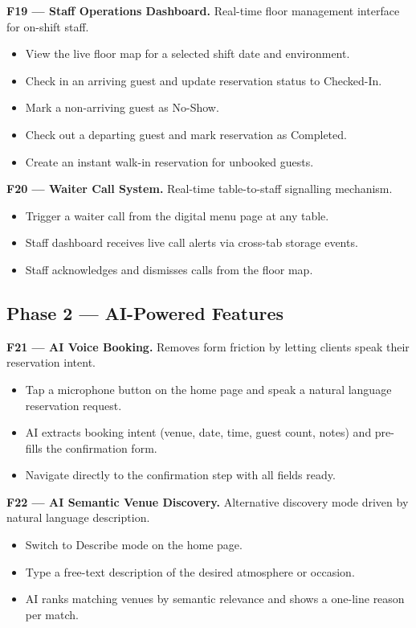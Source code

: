 \documentclass[12pt,a4paper]{article}
\begin{document}
\textbf{F19 --- Staff Operations Dashboard.}
Real-time floor management interface for on-shift staff.
\begin{itemize}[leftmargin=1.5em, topsep=2pt, itemsep=1pt]
    \item View the live floor map for a selected shift date and environment.
    \item Check in an arriving guest and update reservation status to
          Checked-In.
    \item Mark a non-arriving guest as No-Show.
    \item Check out a departing guest and mark reservation as Completed.
    \item Create an instant walk-in reservation for unbooked guests.
\end{itemize}

\textbf{F20 --- Waiter Call System.}
Real-time table-to-staff signalling mechanism.
\begin{itemize}[leftmargin=1.5em, topsep=2pt, itemsep=1pt]
    \item Trigger a waiter call from the digital menu page at any table.
    \item Staff dashboard receives live call alerts via cross-tab storage events.
    \item Staff acknowledges and dismisses calls from the floor map.
\end{itemize}

\subsection{Phase 2 --- AI-Powered Features}

\textbf{F21 --- AI Voice Booking.}
Removes form friction by letting clients speak their reservation intent.
\begin{itemize}[leftmargin=1.5em, topsep=2pt, itemsep=1pt]
    \item Tap a microphone button on the home page and speak a natural language
          reservation request.
    \item AI extracts booking intent (venue, date, time, guest count, notes)
          and pre-fills the confirmation form.
    \item Navigate directly to the confirmation step with all fields ready.
\end{itemize}

\textbf{F22 --- AI Semantic Venue Discovery.}
Alternative discovery mode driven by natural language description.
\begin{itemize}[leftmargin=1.5em, topsep=2pt, itemsep=1pt]
    \item Switch to Describe mode on the home page.
    \item Type a free-text description of the desired atmosphere or occasion.
    \item AI ranks matching venues by semantic relevance and shows a one-line
          reason per match.
\end{itemize}
\end{document}
